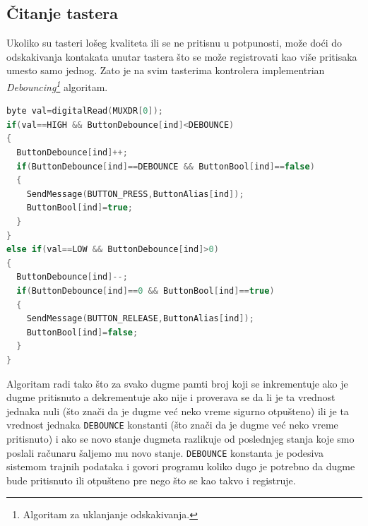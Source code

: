\documentclass[12pt,oneside]{memoir}
\begin{document}
	\subsection{Čitanje tastera}
	\label{bounce}
	Ukoliko su tasteri lošeg kvaliteta ili se ne pritisnu u potpunosti, može doći do odskakivanja kontakata unutar tastera što se može registrovati kao više pritisaka umesto samo jednog. Zato je na svim tasterima kontrolera implementrian \textit{Debouncing\footnote{Algoritam za uklanjanje odskakivanja.}} algoritam.
	\begin{lstlisting}[language=C++]
byte val=digitalRead(MUXDR[0]);
if(val==HIGH && ButtonDebounce[ind]<DEBOUNCE)
{
  ButtonDebounce[ind]++;
  if(ButtonDebounce[ind]==DEBOUNCE && ButtonBool[ind]==false)
  {
    SendMessage(BUTTON_PRESS,ButtonAlias[ind]);
    ButtonBool[ind]=true;
  }
}
else if(val==LOW && ButtonDebounce[ind]>0)
{
  ButtonDebounce[ind]--;
  if(ButtonDebounce[ind]==0 && ButtonBool[ind]==true)
  {
    SendMessage(BUTTON_RELEASE,ButtonAlias[ind]);
    ButtonBool[ind]=false;
  }
}
	\end{lstlisting}
	Algoritam radi tako što za svako dugme pamti broj koji se inkrementuje ako je dugme pritisnuto a dekrementuje ako nije i proverava se da li je ta vrednost jednaka nuli (što znači da je dugme već neko vreme sigurno otpušteno) ili je ta vrednost jednaka \verb|DEBOUNCE| konstanti (što znači da je dugme već neko vreme pritisnuto) i ako se novo stanje dugmeta razlikuje od poslednjeg stanja koje smo poslali računaru šaljemo mu novo stanje. \verb|DEBOUNCE| konstanta je podesiva sistemom trajnih podataka i govori programu koliko dugo je potrebno da dugme bude pritisnuto ili otpušteno pre nego što se kao takvo i registruje.
\end{document}
